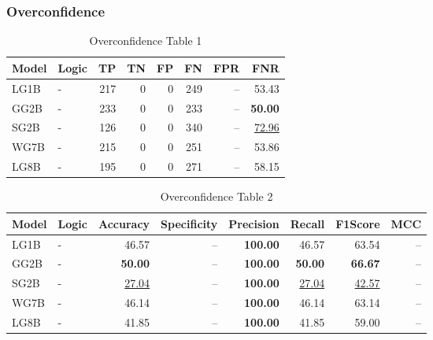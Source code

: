 \documentclass{article}
\begin{document}
\subsubsection{Overconfidence}

\begin{table}[H]
\centering
\begin{tabular}{llrrrrrr}
\toprule
 Model          & Logic   &   TP &   TN &   FP &   FN &   FPR &   FNR \\
\midrule

 LG1B    & -       &  217 &    0 &    0 &  249 & --    & 53.43             \\
 GG2B    & -       &  233 &    0 &    0 &  233 & --    & \textbf{50.00}    \\
 SG2B    & -       &  126 &    0 &    0 &  340 & --    & \underline{72.96} \\
 WG7B    & -       &  215 &    0 &    0 &  251 & --    & 53.86             \\
 LG8B    & -       &  195 &    0 &    0 &  271 & --    & 58.15             \\

\bottomrule
\end{tabular}
\caption{\label{tab:widgets}Overconfidence Table 1}
\end{table}

\begin{table}[H]
\begin{tabular}{llrrrrrr}
\toprule
 Model          & Logic   &   Accuracy &   Specificity &   Precision &   Recall &   F1Score &      MCC \\
\midrule

 LG1B    & -       & 46.57             & --            & \textbf{100.00} & 46.57             & 63.54             & --    \\
 GG2B    & -       & \textbf{50.00}    & --            & \textbf{100.00} & \textbf{50.00}    & \textbf{66.67}    & --    \\
 SG2B    & -       & \underline{27.04} & --            & \textbf{100.00} & \underline{27.04} & \underline{42.57} & --    \\
 WG7B    & -       & 46.14             & --            & \textbf{100.00} & 46.14             & 63.14             & --    \\
 LG8B    & -       & 41.85             & --            & \textbf{100.00} & 41.85             & 59.00             & --    \\

\bottomrule
\end{tabular}
\caption{\label{tab:xstest2}Overconfidence Table 2}
\end{table}
\end{document}
